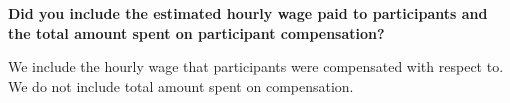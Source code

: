 \documentclass{article}
\begin{document}
\textbf{Did you include the estimated hourly wage paid to participants and the total amount spent on participant compensation?}

We include the hourly wage that participants were compensated with respect to. 
We do not include total amount spent on compensation.




\end{document}
